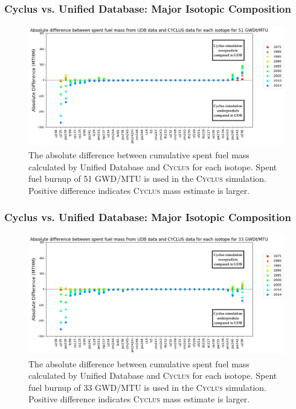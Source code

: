 \begin{frame}
    \frametitle{Cyclus vs. Unified Database: Major Isotopic Composition}
    \begin{figure}[htbp!]
        \begin{center}
          \includegraphics[height=5.3cm]{../figures/absolute_diff_all_51}
        \end{center}
              \caption{The absolute difference between cumulative spent fuel mass calculated by 
              Unified Database and \textsc{Cyclus} for each isotope. Spent fuel burnup of 51 GWD/MTU is used in the \textsc{Cyclus} simulation.
              Positive difference indicates \textsc{Cyclus}
              mass estimate is larger.}
        \label{fig:totalmass}
      \end{figure}
\end{frame}

\begin{frame}
    \frametitle{Cyclus vs. Unified Database: Major Isotopic Composition}
    \begin{figure}[htbp!]
        \begin{center}
          \includegraphics[height=5.3cm]{../figures/absolute_diff_all_33}
        \end{center}
        \caption{The absolute difference between cumulative spent fuel mass calculated by 
        Unified Database and \textsc{Cyclus} for each isotope. Spent fuel burnup of 33 GWD/MTU is used in the \textsc{Cyclus} simulation.
        Positive difference indicates \textsc{Cyclus}
        mass estimate is larger.}
        \label{fig:totalmass}
      \end{figure}
\end{frame}

